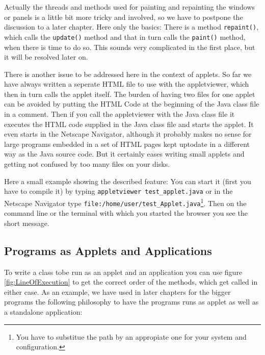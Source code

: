 Actually the threads and methods used for painting and repainting
the windows or panels is a little bit more tricky and involved, so we
have to postpone the discussion to a later chapter. Here only the basics:
There is a method \verb|repaint()|, which calls the \verb|update()|
method and that in turn calls the \verb|paint()| method, when there is time
to do so. This sounds very complicated in the first place, but 
it will be resolved later on.

There is another issue to be addressed here in the context of applets.
So far we have always written a seperate HTML file to use with the
appletviewer, which then in turn calls the applet itself. The burden
of having two files for one applet can be avoided by putting the
HTML Code at the beginning of the Java class file in a comment. Then
if you call the appletviewer with the Java class file 
it executes the HTML code supplied
in the Java class file and starts the applet. It even starts in
the Netscape Navigator, although it probably makes no sense for
large programs embedded in a set of HTML pages kept uptodate in a
different way as the Java source code. But it certainly eases
writing small applets and getting not confused by too many files on
your disks. 

Here a small example showing the described feature:
You can start it (first you have to compile it) 
by typing \verb|appletviewer test_applet.java| or 
in the Netscape Navigator type 
\verb|file:/home/user/test_Applet.java|\footnote{You have to substitue the path 
  by an appropiate one for your system and configuration.}.
Then on the command line or the terminal with which you started the browser  
you see the short message.


\subsection{Programs as Applets and Applications}
To write a class tobe run as an applet and an application
you can use figure \ref{fig:LineOfExecution} to get the correct order
of the methods, which get called in either case. As an example, we have used
in later chapters for the bigger programs the following philosophy
to have the programs runs as applet as well as a standalone application:



